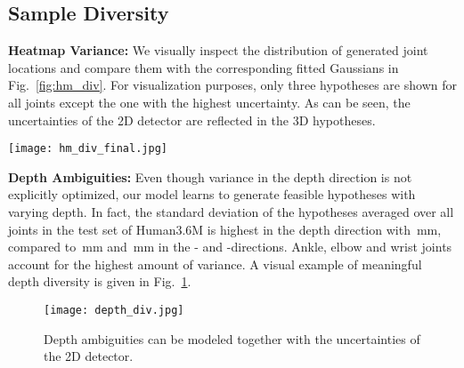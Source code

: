 \documentclass[10pt,twocolumn,letterpaper]{article}
\begin{document}
\subsection{Sample Diversity}

\textbf{Heatmap Variance:} We visually inspect the distribution of generated joint locations and compare them with the corresponding fitted Gaussians in Fig.~\ref{fig:hm_div}. For visualization purposes, only three hypotheses are shown for all joints except the one with the highest uncertainty. As can be seen, the uncertainties of the 2D detector are reflected in the 3D hypotheses.

\begin{figure*}
\begin{center}
\texttt{[image: hm\_div\_final.jpg]}
\caption{The uncertainties of the 2D detector are successfully reflected in the 3D pose hypotheses. For visualization purposes, we only show the fitted Gaussian and a high number of hypotheses for the joint with highest uncertainty.}
\vspace{-1.9em}
\label{fig:hm_div}
\end{center}
\end{figure*}


\textbf{Depth Ambiguities:}
Even though variance in the depth direction is not explicitly optimized, our model learns to generate feasible hypotheses with varying depth.
In fact, the standard deviation of the hypotheses averaged over all joints in the test set of Human3.6M is highest in the depth direction with \,mm, compared to \,mm and \,mm in the - and -directions.
Ankle, elbow and wrist joints account for the highest amount of variance.
A visual example of meaningful depth diversity is given in Fig.~\ref{fig:depth_var}.

\begin{figure}
\begin{center}
\texttt{[image: depth\_div.jpg]}
\caption{Depth ambiguities can be modeled together with the uncertainties of the 2D detector.}
\vspace{-1.5em}
\label{fig:depth_var}
\end{center}
\end{figure}
\end{document}
